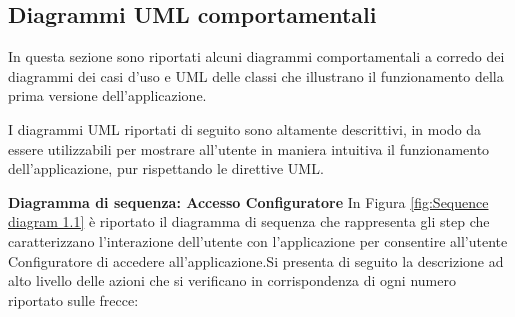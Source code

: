 \subsection{Diagrammi UML comportamentali}
In questa sezione sono riportati alcuni diagrammi comportamentali a corredo dei diagrammi dei casi d'uso e UML delle classi che illustrano il funzionamento della prima versione dell'applicazione.

I diagrammi UML riportati di seguito sono altamente descrittivi, in modo da essere utilizzabili per mostrare all'utente in maniera intuitiva il funzionamento dell'applicazione, pur rispettando le direttive UML.\bigskip

\textbf{Diagramma di sequenza: Accesso Configuratore}\newline
In Figura \ref{fig:Sequence diagram 1.1} è riportato il diagramma di sequenza che rappresenta gli step che caratterizzano l'interazione dell'utente con l'applicazione per consentire all'utente Configuratore di accedere all'applicazione.\newline Si presenta di seguito la descrizione ad alto livello delle azioni che si verificano in corrispondenza di ogni numero riportato sulle frecce:

